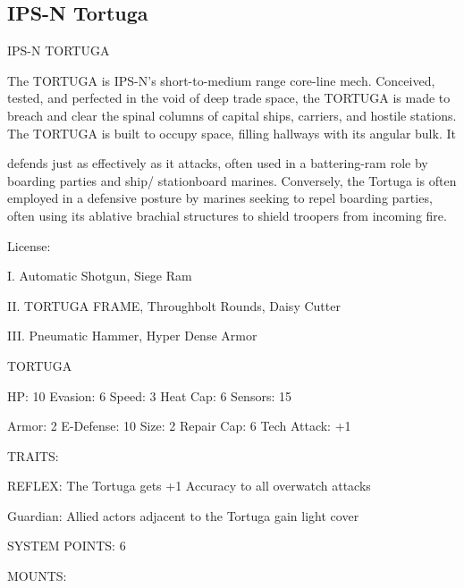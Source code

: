 \subsection{IPS-N Tortuga}

                                                   IPS-N TORTUGA  

The TORTUGA is IPS-N’s short-to-medium range core-line mech. Conceived, tested, and perfected in the  
void of deep trade space, the TORTUGA is made to breach and clear the spinal columns of capital ships,  
carriers, and hostile stations. The TORTUGA is built to occupy space, filling hallways with its angular bulk. It  

                                                                                                                               


defends just as effectively as it attacks, often used in a battering-ram role by boarding parties and ship/ 
stationboard marines. Conversely, the Tortuga is often employed in a defensive posture by marines seeking  
to repel boarding parties, often using its ablative brachial structures to shield troopers from incoming fire.     

                                                   License:
 
I. Automatic Shotgun, Siege Ram
 
II. TORTUGA FRAME, Throughbolt Rounds, Daisy Cutter
 
III. Pneumatic Hammer, Hyper Dense Armor
 

                                                 TORTUGA 

  HP: 10         Evasion: 6                            Speed: 3           Heat Cap: 6        Sensors: 15 

  Armor: 2       E-Defense: 10                         Size: 2            Repair Cap: 6      Tech Attack:  
                                                                                             +1 

                                                   TRAITS: 

  REFLEX: The Tortuga gets +1 Accuracy to all overwatch attacks
 
  Guardian: Allied actors adjacent to the Tortuga gain light cover  

                                             SYSTEM POINTS: 6 

                                                   MOUNTS: 

